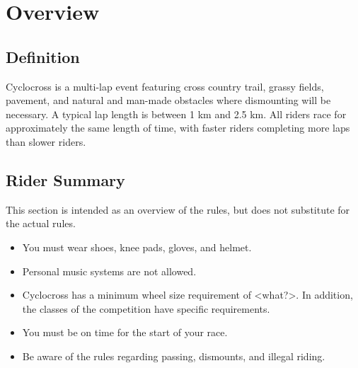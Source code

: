 \chapter{Overview \label{chap:cyclocross}}

\section{Definition}

Cyclocross is a multi-lap event featuring cross country trail, grassy
fields, pavement, and natural and man-made obstacles where dismounting will
be necessary. A typical lap length is between 1 km and 2.5 km. All riders
race for approximately the same length of time, with faster riders
completing more laps than slower riders. 

\section{Rider Summary}

This section is intended as an overview of the rules, but does not
substitute for the actual rules.

\begin{itemize}
\item You must wear shoes, knee pads, gloves, and helmet.
\item Personal music systems are not allowed.
\item Cyclocross has a minimum wheel size requirement of <what?>. In addition, the classes of the competition have specific requirements.
\item You must be on time for the start of your race.
\item Be aware of the rules regarding passing, dismounts, and illegal riding.
\end{itemize}